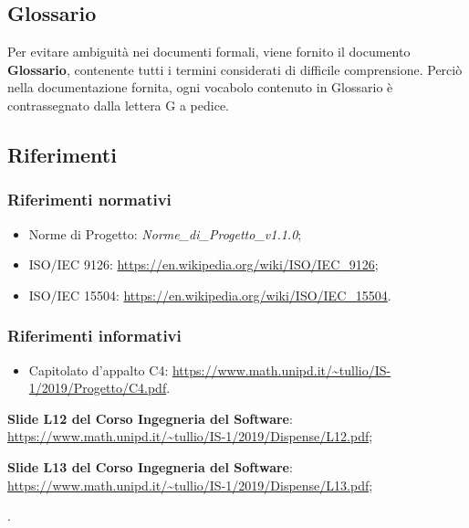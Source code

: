 \subsection{Glossario}
Per evitare ambiguità nei documenti formali, viene fornito il documento \textbf{Glossario},
contenente tutti i termini considerati di difficile comprensione. Perciò nella documentazione fornita, ogni vocabolo contenuto in Glossario è contrassegnato dalla lettera G a pedice.

\subsection{Riferimenti}
\subsubsection{Riferimenti normativi}
\begin{itemize}
	\item Norme di Progetto: \textit{Norme_di_Progetto_v1.1.0};
	\item ISO/IEC 9126: \url{https://en.wikipedia.org/wiki/ISO/IEC_9126};
	\item ISO/IEC 15504: \url{https://en.wikipedia.org/wiki/ISO/IEC_15504}.
\end{itemize}
\subsubsection{Riferimenti informativi}
\begin{itemize}
	\item Capitolato d'appalto C4: \url{https://www.math.unipd.it/~tullio/IS-1/2019/Progetto/C4.pdf}.
\end{itemize}
	\item \textbf{Slide L12 del Corso Ingegneria del Software}:\\
	\url{https://www.math.unipd.it/~tullio/IS-1/2019/Dispense/L12.pdf};
		\item \textbf{Slide L13 del Corso Ingegneria del Software}:\\
	\url{https://www.math.unipd.it/~tullio/IS-1/2019/Dispense/L13.pdf};
		\item {}.
